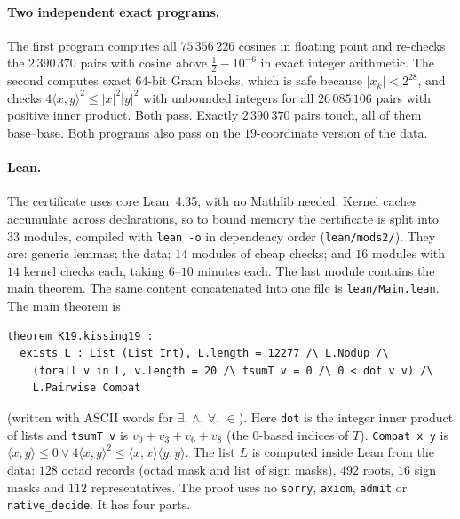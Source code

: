 \documentclass[11pt]{article}
\numberwithin{equation}{section}
\theoremstyle{definition}
\theoremstyle{remark}
\begin{document}
\paragraph{Two independent exact programs.} The first program computes all $75\,356\,226$ cosines
in floating point and re-checks the $2\,390\,370$ pairs with cosine above $\tfrac12-10^{-6}$ in exact
integer arithmetic. The second computes exact $64$-bit Gram blocks, which is safe because
$|x_k|<2^{28}$, and checks $4\langle x,y\rangle^2\le|x|^2|y|^2$ with unbounded integers for all
$26\,085\,106$ pairs with positive inner product. Both pass. Exactly $2\,390\,370$ pairs touch, all
of them base--base. Both programs also pass on the $19$-coordinate version of the data.

\paragraph{Lean.} The certificate uses core Lean~4.35, with no Mathlib needed. Kernel caches accumulate
across declarations, so to bound memory the certificate is split into $33$ modules, compiled with
\texttt{lean -o} in dependency order (\texttt{lean/mods2/}). They are: generic lemmas; the data;
$14$ modules of cheap checks; and $16$ modules with $14$ kernel checks each, taking $6$--$10$ minutes
each. The last module contains the main theorem. The same content concatenated into one file is
\texttt{lean/Main.lean}. The main theorem is
\begin{verbatim}
theorem K19.kissing19 :
  exists L : List (List Int), L.length = 12277 /\ L.Nodup /\
    (forall v in L, v.length = 20 /\ tsumT v = 0 /\ 0 < dot v v) /\
    L.Pairwise Compat
\end{verbatim}
(written with ASCII words for $\exists$, $\wedge$, $\forall$, $\in$).
Here \texttt{dot} is the integer inner product of lists and \texttt{tsumT v} is $v_0+v_3+v_6+v_8$
(the $0$-based indices of $T$). \texttt{Compat x y} is
$\langle x,y\rangle\le0\vee 4\langle x,y\rangle^2\le\langle x,x\rangle\langle y,y\rangle$. The list
$L$ is computed inside Lean from the data: $128$ octad records (octad mask and list of sign masks),
$492$ roots, $16$ sign masks and $112$ representatives. The proof uses no \texttt{sorry},
\texttt{axiom}, \texttt{admit} or \texttt{native\_decide}. It has four parts.
\end{document}
